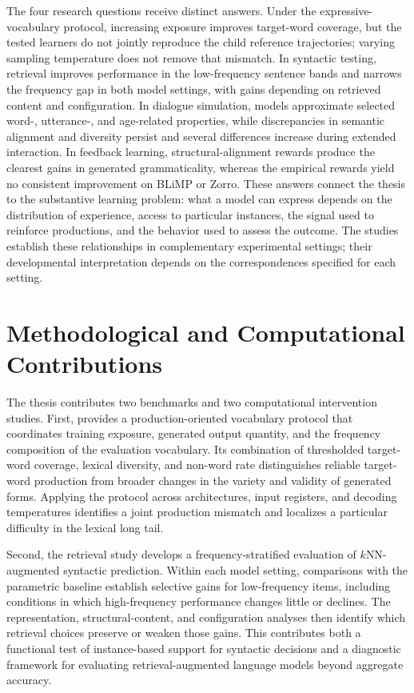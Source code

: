 The four research questions receive distinct answers. Under the expressive-vocabulary protocol, increasing exposure improves target-word coverage, but the tested learners do not jointly reproduce the child reference trajectories; varying sampling temperature does not remove that mismatch. In syntactic testing, retrieval improves performance in the low-frequency sentence bands and narrows the frequency gap in both model settings, with gains depending on retrieved content and configuration. In dialogue simulation, models approximate selected word-, utterance-, and age-related properties, while discrepancies in semantic alignment and diversity persist and several differences increase during extended interaction. In feedback learning, structural-alignment rewards produce the clearest gains in generated grammaticality, whereas the empirical rewards yield no consistent improvement on BLiMP or Zorro. These answers connect the thesis to the substantive learning problem: what a model can express depends on the distribution of experience, access to particular instances, the signal used to reinforce productions, and the behavior used to assess the outcome. The studies establish these relationships in complementary experimental settings; their developmental interpretation depends on the correspondences specified for each setting.

\section{Methodological and Computational Contributions}
\label{sec:gd_contributions}

The thesis contributes two benchmarks and two computational intervention studies. First, \meCDI{} provides a production-oriented vocabulary protocol that coordinates training exposure, generated output quantity, and the frequency composition of the evaluation vocabulary. Its combination of thresholded target-word coverage, lexical diversity, and non-word rate distinguishes reliable target-word production from broader changes in the variety and validity of generated forms. Applying the protocol across architectures, input registers, and decoding temperatures identifies a joint production mismatch and localizes a particular difficulty in the lexical long tail.

Second, the retrieval study develops a frequency-stratified evaluation of $k$NN-augmented syntactic prediction. Within each model setting, comparisons with the parametric baseline establish selective gains for low-frequency items, including conditions in which high-frequency performance changes little or declines. The representation, structural-content, and configuration analyses then identify which retrieval choices preserve or weaken those gains. This contributes both a functional test of instance-based support for syntactic decisions and a diagnostic framework for evaluating retrieval-augmented language models beyond aggregate accuracy.

